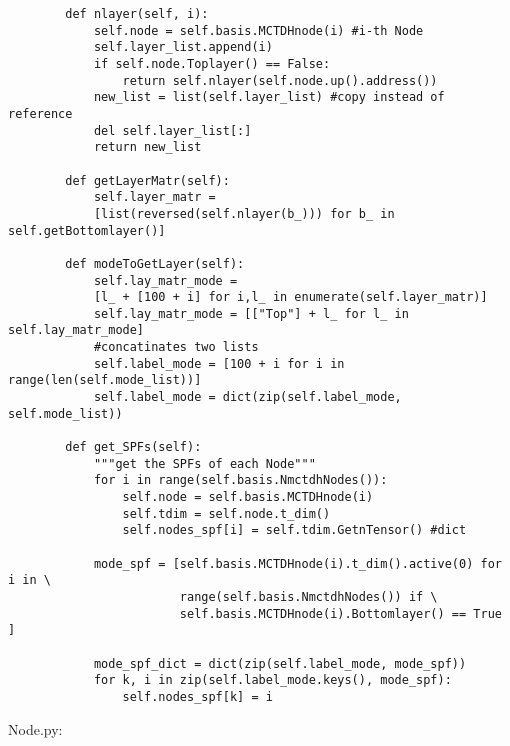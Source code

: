 \begin{verbatim}
        def nlayer(self, i):
            self.node = self.basis.MCTDHnode(i) #i-th Node
            self.layer_list.append(i)
            if self.node.Toplayer() == False:
                return self.nlayer(self.node.up().address())
            new_list = list(self.layer_list) #copy instead of reference
            del self.layer_list[:]
            return new_list
    
        def getLayerMatr(self):
            self.layer_matr = 
            [list(reversed(self.nlayer(b_))) for b_ in self.getBottomlayer()]
    
        def modeToGetLayer(self):
            self.lay_matr_mode = 
            [l_ + [100 + i] for i,l_ in enumerate(self.layer_matr)]
            self.lay_matr_mode = [["Top"] + l_ for l_ in self.lay_matr_mode]
            #concatinates two lists
            self.label_mode = [100 + i for i in range(len(self.mode_list))]
            self.label_mode = dict(zip(self.label_mode, self.mode_list))
    
        def get_SPFs(self):
            """get the SPFs of each Node"""
            for i in range(self.basis.NmctdhNodes()):
                self.node = self.basis.MCTDHnode(i)
                self.tdim = self.node.t_dim()
                self.nodes_spf[i] = self.tdim.GetnTensor() #dict
    
            mode_spf = [self.basis.MCTDHnode(i).t_dim().active(0) for i in \
                        range(self.basis.NmctdhNodes()) if \
                        self.basis.MCTDHnode(i).Bottomlayer() == True ]
    
            mode_spf_dict = dict(zip(self.label_mode, mode_spf))
            for k, i in zip(self.label_mode.keys(), mode_spf):
                self.nodes_spf[k] = i
\end{verbatim}

Node.py:

